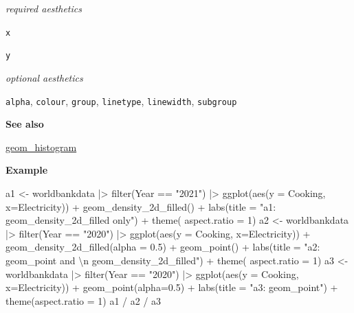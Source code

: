 \documentclass[
  letterpaper,
  DIV=11,
  numbers=noendperiod]{scrreprt}
\newenvironment{Shaded}{\begin{snugshade}}{\end{snugshade}}
\newcommand{\AttributeTok}[1]{\textcolor[rgb]{0.40,0.45,0.13}{#1}}
\newcommand{\DecValTok}[1]{\textcolor[rgb]{0.68,0.00,0.00}{#1}}
\newcommand{\FloatTok}[1]{\textcolor[rgb]{0.68,0.00,0.00}{#1}}
\newcommand{\FunctionTok}[1]{\textcolor[rgb]{0.28,0.35,0.67}{#1}}
\newcommand{\NormalTok}[1]{\textcolor[rgb]{0.00,0.23,0.31}{#1}}
\newcommand{\OtherTok}[1]{\textcolor[rgb]{0.00,0.23,0.31}{#1}}
\newcommand{\SpecialCharTok}[1]{\textcolor[rgb]{0.37,0.37,0.37}{#1}}
\newcommand{\StringTok}[1]{\textcolor[rgb]{0.13,0.47,0.30}{#1}}
\begin{document}
\emph{required aesthetics}

\texttt{x}

\texttt{y}

\emph{optional aesthetics}

\texttt{alpha}, \texttt{colour}, \texttt{group}, \texttt{linetype},
\texttt{linewidth}, \texttt{subgroup}

\textbf{See also}

\hyperref[hist]{geom\_histogram}

\textbf{Example}

\begin{Shaded}
\begin{Highlighting}[]
\NormalTok{a1 }\OtherTok{\textless{}{-}}\NormalTok{ worldbankdata }\SpecialCharTok{|\textgreater{}}
  \FunctionTok{filter}\NormalTok{(Year }\SpecialCharTok{==} \StringTok{"2021"}\NormalTok{) }\SpecialCharTok{|\textgreater{}}
  \FunctionTok{ggplot}\NormalTok{(}\FunctionTok{aes}\NormalTok{(}\AttributeTok{y =}\NormalTok{ Cooking, }\AttributeTok{x=}\NormalTok{Electricity)) }\SpecialCharTok{+}   
  \FunctionTok{geom\_density\_2d\_filled}\NormalTok{() }\SpecialCharTok{+} 
  \FunctionTok{labs}\NormalTok{(}\AttributeTok{title =} \StringTok{"a1: geom\_density\_2d\_filled only"}\NormalTok{) }\SpecialCharTok{+} 
  \FunctionTok{theme}\NormalTok{( }\AttributeTok{aspect.ratio =} \DecValTok{1}\NormalTok{)}
\NormalTok{a2 }\OtherTok{\textless{}{-}}\NormalTok{ worldbankdata }\SpecialCharTok{|\textgreater{}}
  \FunctionTok{filter}\NormalTok{(Year }\SpecialCharTok{==} \StringTok{"2020"}\NormalTok{) }\SpecialCharTok{|\textgreater{}}
  \FunctionTok{ggplot}\NormalTok{(}\FunctionTok{aes}\NormalTok{(}\AttributeTok{y =}\NormalTok{ Cooking, }\AttributeTok{x=}\NormalTok{Electricity)) }\SpecialCharTok{+}   
  \FunctionTok{geom\_density\_2d\_filled}\NormalTok{(}\AttributeTok{alpha =} \FloatTok{0.5}\NormalTok{) }\SpecialCharTok{+} 
    \FunctionTok{geom\_point}\NormalTok{() }\SpecialCharTok{+} 
  \FunctionTok{labs}\NormalTok{(}\AttributeTok{title =} \StringTok{"a2: geom\_point and }\SpecialCharTok{\textbackslash{}n}\StringTok{ geom\_density\_2d\_filled"}\NormalTok{) }\SpecialCharTok{+} 
  \FunctionTok{theme}\NormalTok{( }\AttributeTok{aspect.ratio =} \DecValTok{1}\NormalTok{)}
\NormalTok{a3 }\OtherTok{\textless{}{-}}\NormalTok{ worldbankdata }\SpecialCharTok{|\textgreater{}}
  \FunctionTok{filter}\NormalTok{(Year }\SpecialCharTok{==} \StringTok{"2020"}\NormalTok{) }\SpecialCharTok{|\textgreater{}}
  \FunctionTok{ggplot}\NormalTok{(}\FunctionTok{aes}\NormalTok{(}\AttributeTok{y =}\NormalTok{ Cooking, }\AttributeTok{x=}\NormalTok{Electricity)) }\SpecialCharTok{+}   
  \FunctionTok{geom\_point}\NormalTok{(}\AttributeTok{alpha=}\FloatTok{0.5}\NormalTok{) }\SpecialCharTok{+} 
  \FunctionTok{labs}\NormalTok{(}\AttributeTok{title =} \StringTok{"a3: geom\_point"}\NormalTok{) }\SpecialCharTok{+} 
  \FunctionTok{theme}\NormalTok{(}\AttributeTok{aspect.ratio =} \DecValTok{1}\NormalTok{)}
\NormalTok{a1 }\SpecialCharTok{/}\NormalTok{ a2 }\SpecialCharTok{/}\NormalTok{ a3}
\end{Highlighting}
\end{Shaded}
\end{document}
